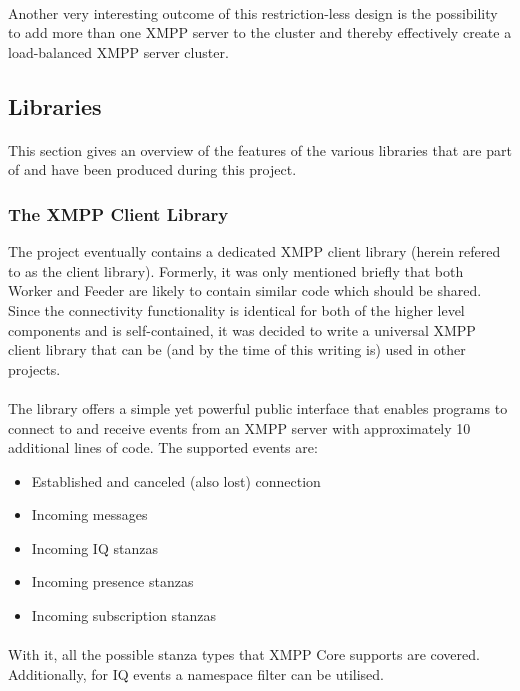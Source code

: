 \paragraph{}
Another very interesting outcome of this restriction-less design is the possibility to add more than one XMPP server to the cluster and thereby effectively create a load-balanced XMPP server cluster.

\subsection{Libraries}
\paragraph{}
This section gives an overview of the features of the various libraries that are part of and have been produced during this project.

\subsubsection{The XMPP Client Library}
The project eventually contains a dedicated XMPP client library (herein refered to as the client library). Formerly, it was only mentioned briefly that both Worker and Feeder are likely to contain similar code which should be shared. Since the connectivity functionality is identical for both of the higher level components and is self-contained, it was decided to write a universal XMPP client library that can be (and by the time of this writing is) used in other projects.
\paragraph{}
The library offers a simple yet powerful public interface that enables programs to connect to and receive events from an XMPP server with approximately 10 additional lines of code. The supported events are:
\begin{itemize}
\item Established and canceled (also lost) connection
\item Incoming messages
\item Incoming IQ stanzas
\item Incoming presence stanzas
\item Incoming subscription stanzas
\end{itemize}
\paragraph{}
With it, all the possible stanza types that XMPP Core supports are covered. Additionally, for IQ events a namespace filter can be utilised.

